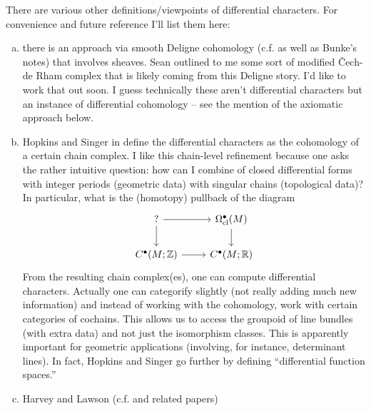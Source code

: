 \documentclass{amsart}
\begin{document}
There are various other definitions/viewpoints of differential characters. For convenience
and future reference I'll list them here:
\begin{enumerate}[(a)]
    \item there is an approach via smooth Deligne cohomology (c.f. \cite{brylinski} as well
        as Bunke's notes) that
        involves sheaves. Sean outlined to me some sort of modified \v Cech-de Rham complex
        that is likely coming from this Deligne story. I'd like to work that out soon.
        I guess technically these aren't differential characters but an instance of differential
        cohomology -- see the mention of the axiomatic approach below.
    \item Hopkins and Singer in \cite{hopkins-singer}
        define the differential characters as the cohomology of a certain
        chain complex. I like this chain-level refinement because one asks the rather intuitive
        question: how can I combine of closed differential forms with integer periods
        (geometric data) with singular chains (topological data)? In particular, what is the
        (homotopy) pullback of the diagram
        \begin{equation*}
            \begin{tikzcd}
                ?\rar\dar & \Omega^\bullet_\text{cl}(M)\dar\\
                C^\bullet(M;\Z)\rar & C^\bullet(M;\R)
            \end{tikzcd}
        \end{equation*}
        From the resulting chain complex(es), one can compute differential characters.
        Actually one can categorify slightly (not really adding much new information) and
        instead of working with the cohomology, work with certain categories of cochains.
        This allows us to access the groupoid of line bundles (with extra data) and not just
        the isomorphism classes. This is apparently important for geometric applications
        (involving, for instance, determinant lines).
        In fact, Hopkins and Singer go further by defining ``differential function spaces.''
    \item Harvey and Lawson (c.f. \cite{hlz} and related papers)

\end{enumerate}
\end{document}
